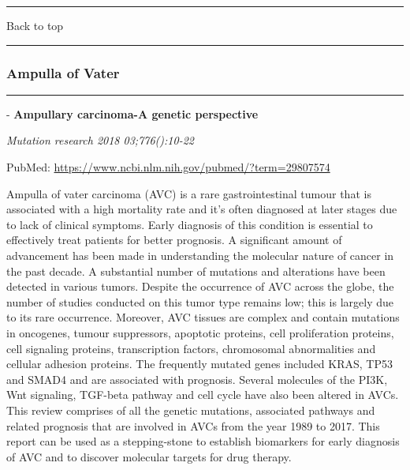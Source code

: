 \documentclass[]{article}
\begin{document}
{}

{}

\begin{center}\rule{0.5\linewidth}{\linethickness}\end{center}

Back to top

\begin{center}\rule{0.5\linewidth}{\linethickness}\end{center}

\pagebreak

\hypertarget{ampulla-of-vater-1}{%
\subsubsection{Ampulla of Vater}\label{ampulla-of-vater-1}}

\begin{center}\rule{0.5\linewidth}{\linethickness}\end{center}

 - \textbf{Ampullary carcinoma-A genetic perspective}

\emph{Mutation research 2018 03;776():10-22}

PubMed: \url{https://www.ncbi.nlm.nih.gov/pubmed/?term=29807574}

Ampulla of vater carcinoma (AVC) is a rare gastrointestinal tumour that
is associated with a high mortality rate and it's often diagnosed at
later stages due to lack of clinical symptoms. Early diagnosis of this
condition is essential to effectively treat patients for better
prognosis. A significant amount of advancement has been made in
understanding the molecular nature of cancer in the past decade. A
substantial number of mutations and alterations have been detected in
various tumors. Despite the occurrence of AVC across the globe, the
number of studies conducted on this tumor type remains low; this is
largely due to its rare occurrence. Moreover, AVC tissues are complex
and contain mutations in oncogenes, tumour suppressors, apoptotic
proteins, cell proliferation proteins, cell signaling proteins,
transcription factors, chromosomal abnormalities and cellular adhesion
proteins. The frequently mutated genes included KRAS, TP53 and SMAD4 and
are associated with prognosis. Several molecules of the PI3K, Wnt
signaling, TGF-beta pathway and cell cycle have also been altered in
AVCs. This review comprises of all the genetic mutations, associated
pathways and related prognosis that are involved in AVCs from the year
1989 to 2017. This report can be used as a stepping-stone to establish
biomarkers for early diagnosis of AVC and to discover molecular targets
for drug therapy.
\end{document}
